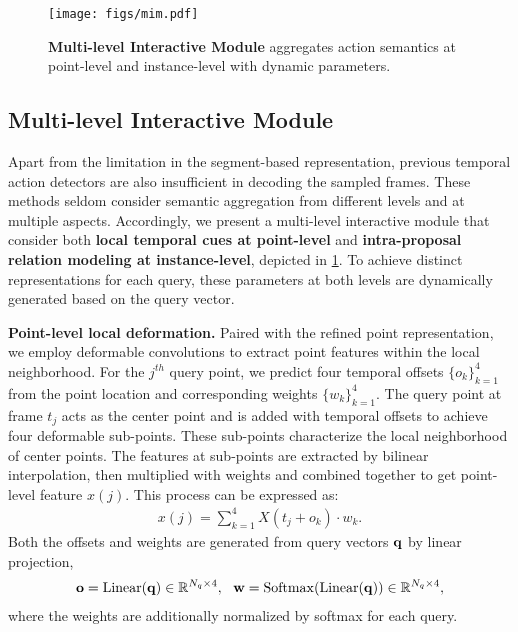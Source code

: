 \documentclass{article}
\renewcommand{\paragraph}[1]{\vspace{1.25mm}\noindent\textbf{#1}}
\begin{document}
\begin{figure}[t]
  \centering
  \texttt{[image: figs/mim.pdf]}
  \caption{{\bf Multi-level Interactive Module} aggregates action semantics at point-level and instance-level with dynamic parameters. }
  \vspace{-2mm}
  \label{fig:mim}
\end{figure}

\subsection{Multi-level Interactive Module}
\label{sec:mim}
Apart from the limitation in the segment-based representation, previous temporal action detectors are also insufficient in decoding the sampled frames. 
These methods seldom consider semantic aggregation from different levels and at multiple aspects. Accordingly, we present a multi-level interactive module that consider both {\bf local temporal cues at point-level} and {\bf intra-proposal relation modeling at instance-level}, depicted in \cref{fig:mim}. To achieve distinct representations for each query, these parameters at both levels are dynamically generated based on the query vector.

\paragraph{Point-level local deformation.} Paired with the refined point representation, we employ deformable convolutions to extract point features within the local neighborhood. For the $j^{th}$ query point, we predict four temporal offsets $\{o_k\}_{k=1}^4$ from the point location and corresponding weights $\{w_k\}_{k=1}^4$. The query point at frame $t_j$ acts as the center point and is added with temporal offsets to achieve four deformable sub-points. These sub-points characterize the local neighborhood of center points. The features at sub-points are extracted by bilinear interpolation, then multiplied with weights and combined together to get point-level feature $x(j)$. This process can be expressed as:
\begin{align}
    x(j) = \sum_{k=1}^4 X(t_j + o_k) \cdot w_k.
\end{align}
Both the offsets and weights are generated from query vectors ${\bf q}$ by linear projection,
\begin{align}
   {\bf o} = {\rm Linear}({\bf q}) \in \mathbb{R}^{N_q\times 4}, \ \ {\bf w} = {\rm Softmax}({\rm Linear}({\bf q})) \in \mathbb{R}^{N_q \times 4},
\end{align}
where the weights are additionally normalized by softmax for each query.
\end{document}
